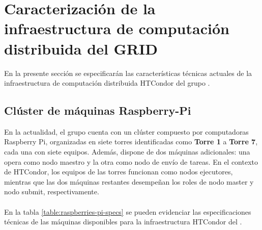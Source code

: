 

\section{Caracterización de la infraestructura de computación distribuida del GRID}
\noindent
En la presente sección se especificarán las características técnicas actuales de la infraestructura de computación distribuida HTCondor del grupo \GRID.


\subsection{Clúster de máquinas Raspberry-Pi}
\noindent

En la actualidad, el grupo \GRID cuenta con un clúster compuesto por computadoras Raspberry Pi, organizadas en siete torres identificadas como \textbf{Torre 1} a \textbf{Torre 7}, cada una con siete equipos. Además, dispone de dos máquinas adicionales: una opera como nodo maestro y la otra como nodo de envío de tareas. En el contexto de HTCondor, los equipos de las torres funcionan como nodos ejecutores, mientras que las dos máquinas restantes desempeñan los roles de nodo master y nodo submit, respectivamente.
\\
\\


En la tabla \ref{table:raspberries-pi-specs} se pueden evidenciar las especificaciones técnicas de las máquinas disponibles para la infraestructura HTCondor del \GRID.
\\



